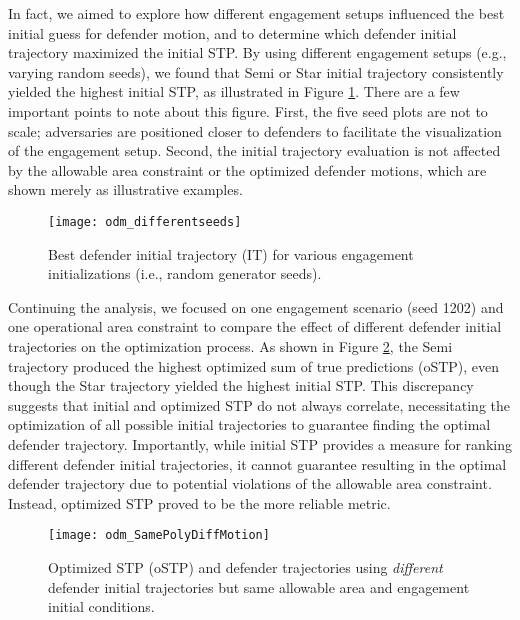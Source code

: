 \documentclass[journal]{IEEEtran} %
\begin{document}
In fact, we aimed to explore how different engagement setups influenced the best initial guess for defender motion, and to determine which defender initial trajectory maximized the initial STP. By using different engagement setups (e.g., varying random seeds), we found that Semi or Star initial trajectory consistently yielded the highest initial STP, as illustrated in Figure \ref{fig:odm_differentseeds}. There are a few important points to note about this figure. First, the five seed plots are not to scale; adversaries are positioned closer to defenders to facilitate the visualization of the engagement setup. Second, the initial trajectory evaluation is not affected by the allowable area constraint or the optimized defender motions, which are shown merely as illustrative examples.

\begin{figure}[h!]
    \centering
    \texttt{[image: odm\_differentseeds]}
    \caption{Best defender initial trajectory (IT) for various engagement initializations (i.e., random generator seeds).}
    \label{fig:odm_differentseeds}
\end{figure}

Continuing the analysis, we focused on one engagement scenario (seed 1202) and one operational area constraint to compare the effect of different defender initial trajectories on the optimization process. As shown in Figure \ref{fig:odm_SamePolyDiffMotion}, the Semi trajectory produced the highest optimized sum of true predictions (oSTP), even though the Star trajectory yielded the highest initial STP. This discrepancy suggests that initial and optimized STP do not always correlate, necessitating the optimization of all possible initial trajectories to guarantee finding the optimal defender trajectory. Importantly, while initial STP provides a measure for ranking different defender initial trajectories, it cannot guarantee resulting in the optimal defender trajectory due to potential violations of the allowable area constraint. Instead, optimized STP proved to be the more reliable metric.

\begin{figure}[h!]
    \centering
    \texttt{[image: odm\_SamePolyDiffMotion]}
    \caption{Optimized STP (oSTP) and defender trajectories using \textit{different} defender initial trajectories but same allowable area and engagement initial conditions.}
    \label{fig:odm_SamePolyDiffMotion}
\end{figure}
\end{document}
